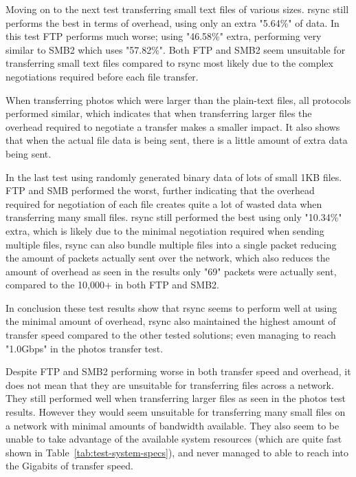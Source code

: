 Moving on to the next test transferring small text files of various sizes. rsync still performs the best in terms of overhead, using only an extra "5.64\%" of data. In this test FTP performs much worse; using "46.58\%" extra, performing very similar to SMB2 which uses "57.82\%". Both FTP and SMB2 seem unsuitable for transferring small text files compared to rsync most likely due to the complex negotiations required before each file transfer.

When transferring photos which were larger than the plain-text files, all protocols performed similar, which indicates that when transferring larger files the overhead required to negotiate a transfer makes a smaller impact. It also shows that when the actual file data is being sent, there is a little amount of extra data being sent.

In the last test using randomly generated binary data of lots of small 1KB files. FTP and SMB performed the worst, further indicating that the overhead required for negotiation of each file creates quite a lot of wasted data when transferring many small files. rsync still performed the best using only "10.34\%" extra, which is likely due to the minimal negotiation required when sending multiple files, rsync can also bundle multiple files into a single packet reducing the amount of packets actually sent over the network, which also reduces the amount of overhead as seen in the results only "69" packets were actually sent, compared to the 10,000+ in both FTP and SMB2.

In conclusion these test results show that rsync seems to perform well at using the minimal amount of overhead, rsync also maintained the highest amount of transfer speed compared to the other tested solutions; even managing to reach "1.0Gbps" in the photos transfer test.

Despite FTP and SMB2 performing worse in both transfer speed and overhead, it does not mean that they are unsuitable for transferring files across a network. They still performed well when transferring larger files as seen in the photos test results. However they would seem unsuitable for transferring many small files on a network with minimal amounts of bandwidth available. They also seem to be unable to take advantage of the available system resources (which are quite fast shown in Table~\ref{tab:test-system-specs}), and never managed to able to reach into the Gigabits of transfer speed.
